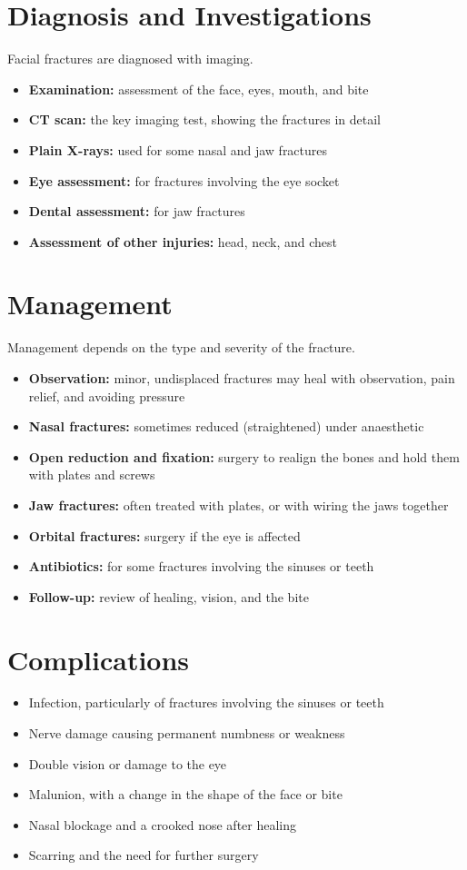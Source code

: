 \section*{Diagnosis and Investigations}
Facial fractures are diagnosed with imaging.
\begin{itemize}
    \item \textbf{Examination:} assessment of the face, eyes, mouth, and bite
    \item \textbf{CT scan:} the key imaging test, showing the fractures in detail
    \item \textbf{Plain X-rays:} used for some nasal and jaw fractures
    \item \textbf{Eye assessment:} for fractures involving the eye socket
    \item \textbf{Dental assessment:} for jaw fractures
    \item \textbf{Assessment of other injuries:} head, neck, and chest
\end{itemize}

\section*{Management}
Management depends on the type and severity of the fracture.
\begin{itemize}
    \item \textbf{Observation:} minor, undisplaced fractures may heal with observation, pain relief, and avoiding pressure
    \item \textbf{Nasal fractures:} sometimes reduced (straightened) under anaesthetic
    \item \textbf{Open reduction and fixation:} surgery to realign the bones and hold them with plates and screws
    \item \textbf{Jaw fractures:} often treated with plates, or with wiring the jaws together
    \item \textbf{Orbital fractures:} surgery if the eye is affected
    \item \textbf{Antibiotics:} for some fractures involving the sinuses or teeth
    \item \textbf{Follow-up:} review of healing, vision, and the bite
\end{itemize}

\section*{Complications}
\begin{itemize}
    \item Infection, particularly of fractures involving the sinuses or teeth
    \item Nerve damage causing permanent numbness or weakness
    \item Double vision or damage to the eye
    \item Malunion, with a change in the shape of the face or bite
    \item Nasal blockage and a crooked nose after healing
    \item Scarring and the need for further surgery
\end{itemize}

